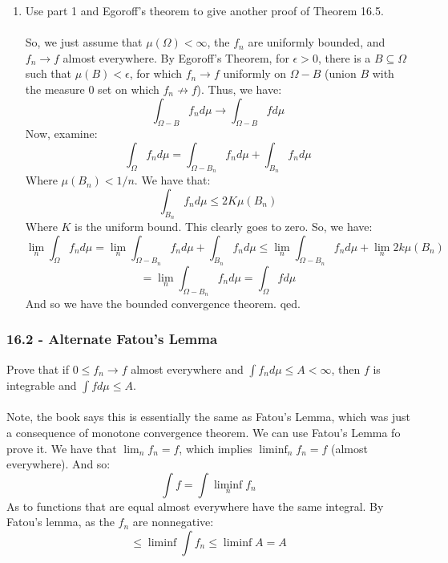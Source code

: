 \documentclass[12pt,a4paper]{article}
\newcommand{\1}[1]{\mathbbm{1}\left\{ #1 \right\}}
\begin{document}
\begin{enumerate}
	\item Use part 1 and Egoroff's theorem to give another proof of Theorem 16.5.
	\\\\
	So, we just assume that $\mu(\Omega) < \infty$, the $f_n$ are uniformly bounded, and $f_n \to f$ almost everywhere. By Egoroff's Theorem, for $\epsilon > 0$, there is a $B \subseteq \Omega$ such that $\mu(B) < \epsilon$, for which $f_n \to f$ uniformly on $\Omega - B$ (union $B$ with the measure 0 set on which $f_n \not \to f$). Thus, we have:
	$$
		\int_{\Omega - B} f_n d\mu \to \int_{\Omega - B} f d\mu
	$$
	Now, examine:
	$$
		\int_\Omega f_n d\mu =
		\int_{\Omega - B_n} f_n d\mu + \int_{B_n} f_n d\mu
	$$
	Where $\mu(B_n) < 1/n$. We have that:
	$$
		\int_{B_n} f_n d\mu \leq 2K\mu(B_n)
	$$
	Where $K$ is the uniform bound. This clearly goes to zero. So, we have:
	$$
		\lim_n \int_\Omega f_n d\mu =
		\lim_n \int_{\Omega - B_n} f_n d\mu + \int_{B_n} f_n d\mu \leq
		\lim_n \int_{\Omega - B_n} f_n d\mu + \lim_n 2k\mu(B_n)
	$$
	$$
		= \lim_n \int_{\Omega - B_n} f_n d\mu = \int_\Omega f d\mu
	$$
	And so we have the bounded convergence theorem. qed.
\end{enumerate}

\subsubsection{16.2 - Alternate Fatou's Lemma} Prove that if $0 \leq f_n \to f$ almost everywhere and $\int f_n d\mu \leq A < \infty$, then $f$ is integrable and $\int f d\mu \leq A$.
\\\\
Note, the book says this is essentially the same as Fatou's Lemma, which was just a consequence of monotone convergence theorem. We can use Fatou's Lemma fo prove it. We have that $\lim_n f_n = f$, which implies $\liminf_n f_n = f$ (almost everywhere). And so:
$$
	\int f = \int \liminf_n f_n
$$
As to functions that are equal almost everywhere have the same integral. By Fatou's lemma, as the $f_n$ are nonnegative:
$$
	\leq \liminf \int f_n \leq \liminf A = A
$$
\end{document}
